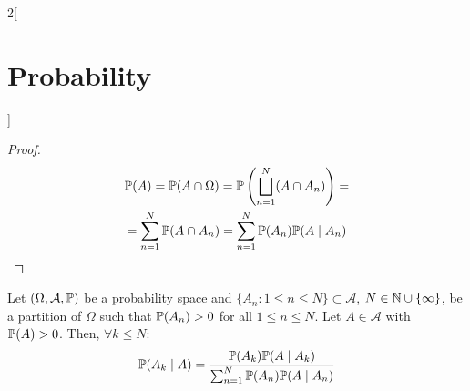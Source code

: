 \documentclass[../../../main_math.tex]{subfiles}
\begin{document}
\begin{multicols}{2}[\section{Probability}]
\begin{proposition}
  \end{proposition}
  \begin{proof}
    \begin{multline*}
      \mathbb{P}(A)=\mathbb{P}(A\cap \Omega)=\mathbb{P}\left(\bigsqcup_{n=1}^N(A\cap A_n)\right)=\\
      =\sum_{n=1}^{N}\mathbb{P}(A\cap A_n)=\sum_{n=1}^N\mathbb{P}(A_n)\mathbb{P}(A\mid A_n)
    \end{multline*}
  \end{proof}
  \begin{proposition}\label{P:bayes}
    Let $(\Omega,\mathcal{A},\mathbb{P})$ be a probability space and $\{A_n:1\leq n\leq N\}\subset\mathcal{A}$, $N\in\mathbb{N}\cup\{\infty\}$, be a partition of $\Omega$ such that $\mathbb{P}(A_n)>0$ for all $1\leq n\leq N$. Let $A\in\mathcal{A}$ with $\mathbb{P}(A)>0$. Then, $\forall k\leq N$: $$\mathbb{P}(A_k\mid A)=\frac{\mathbb{P}(A_k)\mathbb{P}(A\mid A_k)}{\sum_{n=1}^N\mathbb{P}(A_n)\mathbb{P}(A\mid A_n)}$$
  \end{proposition}

\end{multicols}
\end{document}
